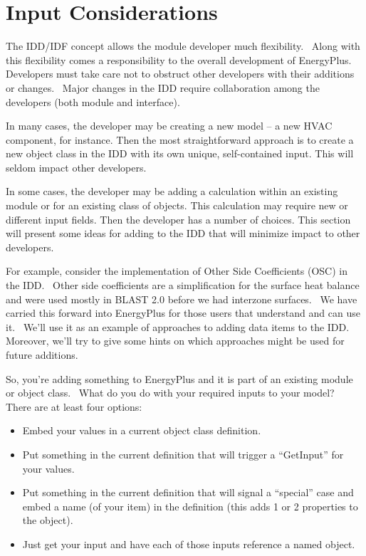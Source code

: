\section{Input Considerations}\label{input-considerations}

The IDD/IDF concept allows the module developer much flexibility.~ Along with this flexibility comes a responsibility to the overall development of EnergyPlus. Developers must take care not to obstruct other developers with their additions or changes.~ Major changes in the IDD require collaboration among the developers (both module and interface).

In many cases, the developer may be creating a new model -- a new HVAC component, for instance. Then the most straightforward approach is to create a new object class in the IDD with its own unique, self-contained input. This will seldom impact other developers.

In some cases, the developer may be adding a calculation within an existing module or for an existing class of objects. This calculation may require new or different input fields. Then the developer has a number of choices. This section will present some ideas for adding to the IDD that will minimize impact to other developers.

For example, consider the implementation of Other Side Coefficients (OSC) in the IDD.~ Other side coefficients are a simplification for the surface heat balance and were used mostly in BLAST 2.0 before we had interzone surfaces.~ We have carried this forward into EnergyPlus for those users that understand and can use it.~ We'll use it as an example of approaches to adding data items to the IDD.~ Moreover, we'll try to give some hints on which approaches might be used for future additions.

So, you're adding something to EnergyPlus and it is part of an existing module or object class.~ What do you do with your required inputs to your model?~ There are at least four options:

\begin{itemize}
\item
  Embed your values in a current object class definition.
\item
  Put something in the current definition that will trigger a ``GetInput'' for your values.
\item
  Put something in the current definition that will signal a ``special'' case and embed a name (of your item) in the definition (this adds 1 or 2 properties to the object).
\item
  Just get your input and have each of those inputs reference a named object.
\end{itemize}

